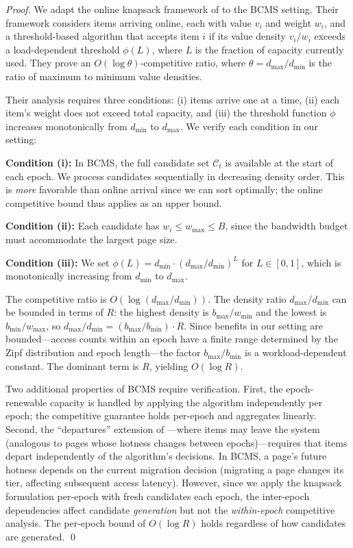 \documentclass{article}
\newcommand{\bw}{B}
\newcommand{\benefit}{b}
\newcommand{\cost}{w}
\begin{document}
\begin{proof}
We adapt the online knapsack framework of \citet{sun2023} to the BCMS setting. Their framework considers items arriving online, each with value $v_i$ and weight $w_i$, and a threshold-based algorithm that accepts item $i$ if its value density $v_i/w_i$ exceeds a load-dependent threshold $\phi(L)$, where $L$ is the fraction of capacity currently used. They prove an $O(\log \theta)$-competitive ratio, where $\theta = d_{\max}/d_{\min}$ is the ratio of maximum to minimum value densities.

Their analysis requires three conditions: (i) items arrive one at a time, (ii) each item's weight does not exceed total capacity, and (iii) the threshold function $\phi$ increases monotonically from $d_{\min}$ to $d_{\max}$. We verify each condition in our setting:

\textbf{Condition (i):} In BCMS, the full candidate set $\mathcal{C}_t$ is available at the start of each epoch. We process candidates sequentially in decreasing density order. This is \emph{more} favorable than online arrival since we can sort optimally; the online competitive bound thus applies as an upper bound.

\textbf{Condition (ii):} Each candidate has $\cost_i \leq \cost_{\max} \leq \bw$, since the bandwidth budget must accommodate the largest page size.

\textbf{Condition (iii):} We set $\phi(L) = d_{\min} \cdot (d_{\max}/d_{\min})^{L}$ for $L \in [0, 1]$, which is monotonically increasing from $d_{\min}$ to $d_{\max}$.

The competitive ratio is $O(\log(d_{\max}/d_{\min}))$. The density ratio $d_{\max}/d_{\min}$ can be bounded in terms of $R$: the highest density is $\benefit_{\max}/\cost_{\min}$ and the lowest is $\benefit_{\min}/\cost_{\max}$, so $d_{\max}/d_{\min} = (\benefit_{\max}/\benefit_{\min}) \cdot R$. Since benefits in our setting are bounded---access counts within an epoch have a finite range determined by the Zipf distribution and epoch length---the factor $\benefit_{\max}/\benefit_{\min}$ is a workload-dependent constant. The dominant term is $R$, yielding $O(\log R)$.

Two additional properties of BCMS require verification. First, the epoch-renewable capacity is handled by applying the algorithm independently per epoch; the competitive guarantee holds per-epoch and aggregates linearly. Second, the ``departures'' extension of \citet{sun2023}---where items may leave the system (analogous to pages whose hotness changes between epochs)---requires that items depart independently of the algorithm's decisions. In BCMS, a page's future hotness depends on the current migration decision (migrating a page changes its tier, affecting subsequent access latency). However, since we apply the knapsack formulation per-epoch with fresh candidates each epoch, the inter-epoch dependencies affect candidate \emph{generation} but not the \emph{within-epoch} competitive analysis. The per-epoch bound of $O(\log R)$ holds regardless of how candidates are generated.
\qed
\end{proof}
\end{document}
